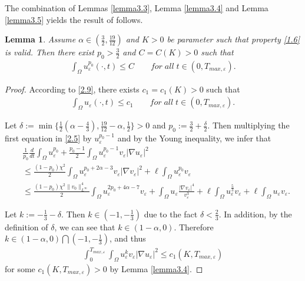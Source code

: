 \documentclass[12pt]{article}
\theoremstyle{plain}
\newtheorem{lemma}{Lemma}[section]
\theoremstyle{definition}
\numberwithin{equation}{section}
\begin{document}
The combination of Lemmas \ref{lemma3.3}, Lemma \ref{lemma3.4} and Lemma \ref{lemma3.5} yields the result of follows.
\begin{lemma}\label{lemma3.6}
Assume $\alpha\in\left(\frac{3}{2},\frac{19}{12}\right)$ and
$K>0$ be parameter such that property \eqref{1.6} is valid. Then there exist $p_0>\frac{3}{2}$ and $C=C(K)>0$ such that
\begin{align}\label{3.15}
    \int_{\Omega}u_{\varepsilon}^{p_0}(\cdot,t)\leq C\qquad for\;all\; t\in (0,T_{max,\varepsilon}).
\end{align}

\end{lemma}
\begin{proof}According to \eqref{2.9}, there exists $c_1=c_1(K)>0$ such that
    \begin{align*}
        \int_{\Omega}u_{\varepsilon}(\cdot,t)\leq c_1\qquad for\; all\; t\in (0,T_{max,\varepsilon}).
    \end{align*}

Let $ \delta:=\min\{\frac 12 (\alpha-\frac{4}{3}) ,\frac{19}{12}-\alpha,\frac12 \}>0$ and
$ p_0:=\frac{3}{2}+  \frac{\delta}2$.
Then multiplying the first equation in \eqref{2.5} by $u_{\varepsilon}^{p_0-1}$ and by the Young inequality, we infer that
\begin{align}\label{3.17}
      & \frac{1}{p_0}\frac{d}{dt}\int_{\Omega}u_{\varepsilon}^{p_0}+\frac{p_0-1}{2}\int_{\Omega}u_{\varepsilon}^{p_0-1}v_{\varepsilon}|\nabla
    u_{\varepsilon}|^2\nonumber\\
    &\leq \frac{(1-p_0)\chi^2}{2}\int_{\Omega}u_{\varepsilon}^{p_0+2\alpha-3}v_{\varepsilon}|\nabla
    v_{\varepsilon}|^2+\ell\int_{\Omega}u_{\varepsilon}^{p_0}v_{\varepsilon}\nonumber
    \\
    &\leq \frac{(1-p_0)\chi^2\|v_0\|_{L^{\infty}}^4}{2}\int_{\Omega}u_{\varepsilon}^{2p_0+4\alpha-7}v_{\varepsilon}+
    \int_{\Omega}u_{\varepsilon}\frac{|\nabla
    v_{\varepsilon}|^4}{v_{\varepsilon}^3}+\ell\int_{\Omega}u_{\varepsilon}^{\frac 53}v_{\varepsilon}
    +\ell\int_{\Omega} u_{\varepsilon}v_{\varepsilon}.
\end{align}

 Let $k:=-\frac13-\delta $. Then $k\in (-1,-\frac13)$ due to the fact $\delta<\frac 23$. In addition,  by the definition of $\delta$, we can see that $k\in (1-\alpha,0)$. Therefore  $k\in (1-\alpha,0)\bigcap (-1,-\frac13)$,  and thus
 \begin{align}\label{3.18}
\int_0^{T_{max,\varepsilon}}\int_{\Omega}u_{\varepsilon}^{k}v_{\varepsilon}|\nabla u_{\varepsilon}|^2\leq c_1(K,T_{max,\varepsilon})
\end{align}
for some  $c_1(K,T_{max,\varepsilon})>0$ by   Lemma \ref{lemma3.4}.


\end{proof}
\end{document}
